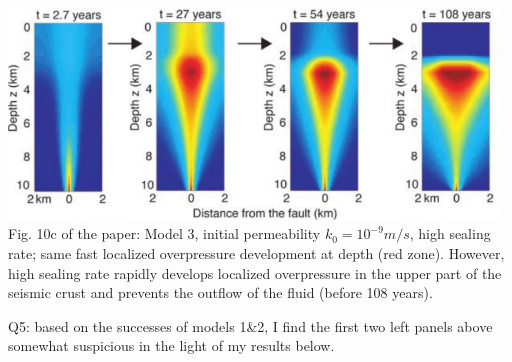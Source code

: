 \begin{center}
\includegraphics[width=13cm]{python_codes/fieldstone_126/images/grfr03_10c}\\
{\captionfont Fig. 10c of the paper:
Model 3, initial permeability $k_0 =10^{-9} m/s$, high sealing rate; same fast localized overpressure 
development at depth (red zone). However, high sealing rate rapidly develops localized overpressure 
in the upper part of the seismic crust and prevents the outflow of the fluid (before 108 years). }
\end{center}

{\color{red} Q5: based on the successes of models 1\&2, 
I find the first two left panels above somewhat suspicious in the 
light of my results below.}

